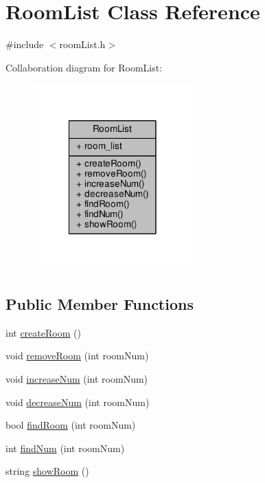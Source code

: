 \hypertarget{class_room_list}{}\section{Room\+List Class Reference}
\label{class_room_list}


{\ttfamily \#include $<$room\+List.\+h$>$}



Collaboration diagram for Room\+List\+:
\nopagebreak
\begin{figure}[H]
\begin{center}
\leavevmode
\includegraphics[width=174pt]{class_room_list__coll__graph}
\end{center}
\end{figure}
\subsection*{Public Member Functions}
\begin{DoxyCompactItemize}
\item 
int \hyperlink{class_room_list_aca4608d77d3d356697c4d1908e1d0980}{create\+Room} ()
\item 
void \hyperlink{class_room_list_aef1e988c07857a4508a2bbe39243ad1f}{remove\+Room} (int room\+Num)
\item 
void \hyperlink{class_room_list_a71acb9f9b8aba6d58fdc81374831e47d}{increase\+Num} (int room\+Num)
\item 
void \hyperlink{class_room_list_a1f1e4ae92bf1e568f7a33147c4f894f2}{decrease\+Num} (int room\+Num)
\item 
bool \hyperlink{class_room_list_a71bcf58fd27f5be3d742743edc71470c}{find\+Room} (int room\+Num)
\item 
int \hyperlink{class_room_list_a25e9ff488f782df5b994f1a7ebe2a29f}{find\+Num} (int room\+Num)
\item 
string \hyperlink{class_room_list_a97fb616a29529bfa0379da8cffbb8c5a}{show\+Room} ()
\end{DoxyCompactItemize}
